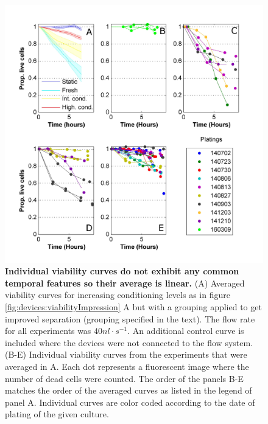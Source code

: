     \begin{figure}[!htb]
            \centering
            \includegraphics[width=15cm]{chapter4/figures/condDetAnalysis/condDetAnalysis.jpg}
            \caption[Example of viability curves from individual steady flow experiments]{\textbf{Individual viability curves do not exhibit any common temporal features so their average is linear.} (A) Averaged viability curves for increasing conditioning levels as in figure \ref{fig:devices:viabilityImpression} A but with a grouping applied to get improved separation (grouping specified in the text). The flow rate for all experiments was \(40 nl\cdot s^{-1}\). An additional control curve is included where the devices were not connected to the flow system. (B-E) Individual viability curves from the experiments that were averaged in A. Each dot represents a fluorescent image where the number of dead cells were counted. The order of the panels B-E matches the order of the averaged curves as listed in the legend of panel A. Individual curves are color coded according to the date of plating of the given culture.}
            \label{fig:devices:viabilityDetAnalysis}
    \end{figure}



